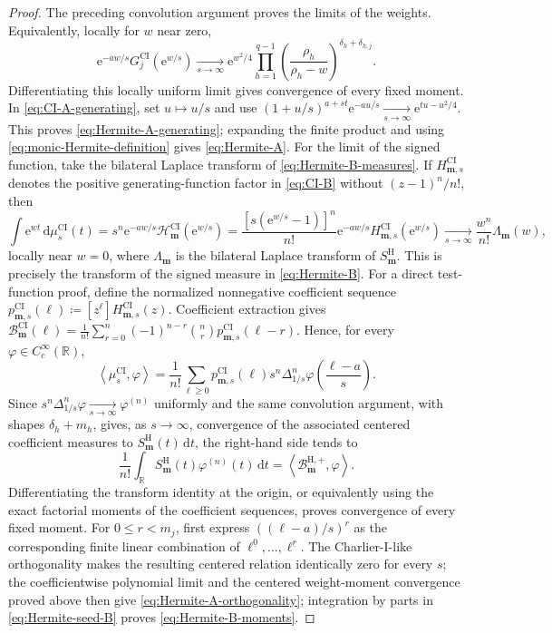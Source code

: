 \documentclass[10pt]{amsart}
\newcommand{\R}{\mathbb R}
\newcommand{\e}{\mathrm e}
\newcommand{\dd}{\,\mathrm d}
\newcommand{\mm}{\boldsymbol m}
\newcommand{\fall}[2]{#1^{\underline{#2}}}
\theoremstyle{plain}
\theoremstyle{definition}
\theoremstyle{remark}
\begin{document}
\begin{proof}
The preceding convolution argument proves the limits of the weights. Equivalently,
locally for \(w\) near zero,
\[
 \e^{-aw/s}G_j^{\mathrm{CI}}(\e^{w/s})
 \xrightarrow[s\to\infty]{}
 \e^{w^2/4}
 \prod_{h=1}^{q-1}\left(\frac{\rho_h}{\rho_h-w}\right)^{
 \delta_h+\delta_{h,j}}.
\]
Differentiating this locally uniform limit gives convergence of every
fixed moment.
In \eqref{eq:CI-A-generating}, set \(u\mapsto u/s\) and use
\((1+u/s)^{a+st}\e^{-au/s}
\xrightarrow[s\to\infty]{}\e^{tu-u^2/4}\).
This proves \eqref{eq:Hermite-A-generating}; expanding the finite product
and using \eqref{eq:monic-Hermite-definition} gives
\eqref{eq:Hermite-A}.
For the limit of the signed function, take the bilateral Laplace transform of
\eqref{eq:Hermite-B-measures}. If \(H_{\mm,s}^{\mathrm{CI}}\) denotes
the positive generating-function factor in \eqref{eq:CI-B} without
\((z-1)^n/n!\), then
\[
 \int\e^{wt}\dd\mu_s^{\mathrm{CI}}(t)
 =s^n\e^{-aw/s}\mathcal H_{\mm}^{\mathrm{CI}}(\e^{w/s})
 =\frac{[s(\e^{w/s}-1)]^n}{n!}
 \e^{-aw/s}H_{\mm,s}^{\mathrm{CI}}(\e^{w/s})
 \xrightarrow[s\to\infty]{}\frac{w^n}{n!}\Lambda_{\mm}(w),
\]
locally near \(w=0\), where \(\Lambda_{\mm}\) is the bilateral Laplace
transform of \(S_{\mm}^{\mathrm H}\). This is precisely the transform
of the signed measure in \eqref{eq:Hermite-B}. For a direct test-function
proof, define the normalized nonnegative coefficient sequence
\(p_{\mm,s}^{\mathrm{CI}}(\ell)
\coloneq[z^\ell]H_{\mm,s}^{\mathrm{CI}}(z)\).
Coefficient extraction gives
\(\mathcal B_{\mm}^{\mathrm{CI}}(\ell)
=\frac1{n!}\sum_{r=0}^n(-1)^{n-r}\binom nr
p_{\mm,s}^{\mathrm{CI}}(\ell-r)\).
Hence, for every \(\varphi\in C_c^\infty(\R)\),
\[
 \left\langle\mu_s^{\mathrm{CI}},\varphi\right\rangle
 =\frac1{n!}\sum_{\ell\ge0}p_{\mm,s}^{\mathrm{CI}}(\ell)
 s^n\Delta_{1/s}^n\varphi\!\left(\frac{\ell-a}{s}\right).
\]
Since \(s^n\Delta_{1/s}^n\varphi
\xrightarrow[s\to\infty]{}\varphi^{(n)}\) uniformly and the same
convolution argument, with shapes \(\delta_h+m_h\), gives, as \(s\to\infty\), convergence of
the associated centered coefficient measures to
\(S_{\mm}^{\mathrm H}(t)\dd t\), the right-hand side tends to
\[
 \frac1{n!}\int_{\R}S_{\mm}^{\mathrm H}(t)
 \varphi^{(n)}(t)\dd t
 =\left\langle\mathcal B_{\mm}^{\mathrm H,+},\varphi\right\rangle.
\]
Differentiating the transform identity at the origin, or equivalently
using the exact factorial moments of the coefficient sequences, proves
convergence of
every fixed moment. For \(0\le r<m_j\), first express
\(((\ell-a)/s)^r\) as the corresponding finite linear combination of
\(\fall{\ell}{0},\ldots,\fall{\ell}{r}\). The Charlier-I-like
orthogonality makes the resulting centered relation identically zero for
every \(s\); the coefficientwise polynomial limit and the centered
weight-moment convergence proved above then give
\eqref{eq:Hermite-A-orthogonality}; integration by parts in
\eqref{eq:Hermite-seed-B} proves \eqref{eq:Hermite-B-moments}.
\end{proof}
\end{document}

